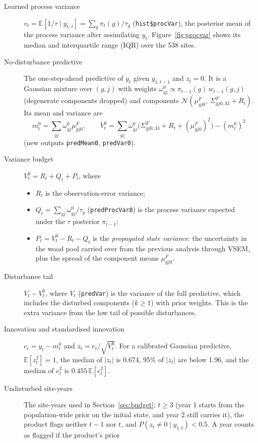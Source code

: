 \documentclass[11pt]{article}
\newcommand{\E}{\mathbb{E}}
\newcommand{\Norm}{\mathcal{N}}
\newcommand{\code}[1]{\texttt{#1}}
\begin{document}
\begin{description}
  \item[Learned process variance] $v_t = \E[1/\tau \mid y_{1:t}] = \sum_g \pi_t(g)/\tau_g$
  (\code{hist\$procVar}), the posterior mean of the process variance after assimilating
  $y_t$. Figure~\ref{fig:procvar} shows its median and interquartile range (IQR) over the 538 sites.
  \item[No-disturbance predictive] The one-step-ahead predictive of $y_t$ given $y_{1:t-1}$ and
  $z_t = 0$. It is a Gaussian mixture over $(g, j)$ with weights
  $\omega^0_{gj} \propto \pi_{t-1}(g)\,w_{t-1}(g,j)$ (degenerate components dropped) and
  components $\Norm(\mu^F_{gj0},\ \Sigma^F_{gj0,33} + R_t)$. Its mean and variance are
  \[
    m^0_t = \sum_{gj}\omega^0_{gj}\mu^F_{gj0}, \qquad
    V^0_t = \sum_{gj}\omega^0_{gj}\big(\Sigma^F_{gj0,33} + R_t + (\mu^F_{gj0})^2\big) - (m^0_t)^2
  \]
  (new outputs \code{predMean0}, \code{predVar0}).
  \item[Variance budget] $V^0_t = R_t + Q_t + P_t$, where
  \begin{itemize}
    \item $R_t$ is the observation-error variance;
    \item $Q_t = \sum_{gj}\omega^0_{gj}/\tau_g$ (\code{predProcVar0}) is the process variance
    expected under the $\tau$ posterior $\pi_{t-1}$;
    \item $P_t = V^0_t - R_t - Q_t$ is the \emph{propagated state variance}: the uncertainty
    in the wood pool carried over from the previous analysis through VSEM, plus the spread
    of the component means $\mu^F_{gj0}$.
  \end{itemize}
  \item[Disturbance tail] $V_t - V^0_t$, where $V_t$ (\code{predVar}) is the variance of the full predictive,
  which includes the disturbed components ($k \ge 1$) with prior weights. This is the
  extra variance from the low tail of possible disturbances.
  \item[Innovation and standardised innovation] $e_t = y_t - m^0_t$ and
  $z_t = e_t / \sqrt{V^0_t}$. For a calibrated Gaussian predictive, $\E[z_t^2] = 1$,
  the median of $|z_t|$ is 0.674, 95\% of $|z_t|$ are below 1.96, and the median of $e_t^2$ is $0.455\,\E[e_t^2]$.
  \item[Undisturbed site-years] The site-years used in Section~\ref{sec:budget}:
  $t \ge 3$ (year 1 starts from the population-wide prior on the initial state, and year 2 still carries it), the product flags neither
  $t-1$ nor $t$, and $P(z_t \ne 0 \mid y_{1:t}) < 0.5$. A year counts as flagged if the product's prior

\end{description}
\end{document}
